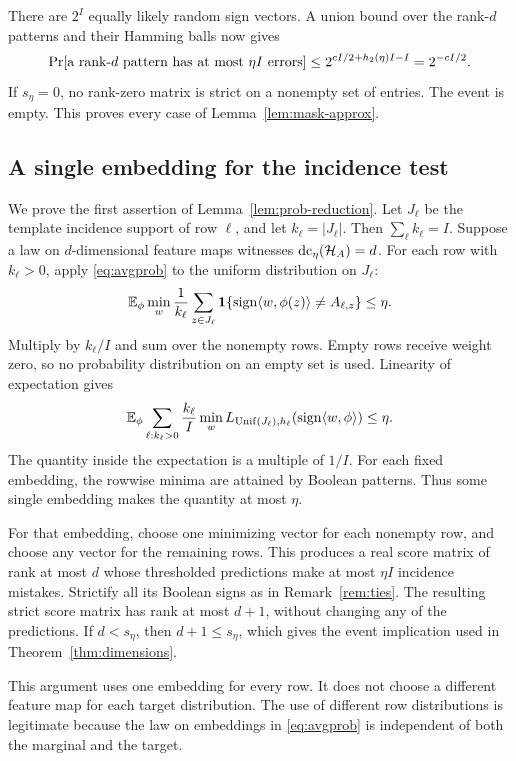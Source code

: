 There are $2^I$ equally likely random sign vectors. A union bound over the rank-$d$ patterns and their Hamming balls now gives
\[
 \Pr[\text{a rank-}d\text{ pattern has at most }\eta I\text{ errors}]
 \le 2^{cI/2+h_2(\eta)I-I}
 =2^{-cI/2}.
\]
If $s_\eta=0$, no rank-zero matrix is strict on a nonempty set of entries. The event is empty. This proves every case of Lemma~\ref{lem:mask-approx}.

\subsection{A single embedding for the incidence test}
We prove the first assertion of Lemma~\ref{lem:prob-reduction}. Let $J_\ell$ be the template incidence support of row $\ell$, and let $k_\ell=|J_\ell|$. Then $\sum_\ell k_\ell=I$. Suppose a law on $d$-dimensional feature maps witnesses $\operatorname{dc}_\eta(\mathcal H_A)=d$. For each row with $k_\ell>0$, apply \eqref{eq:avgprob} to the uniform distribution on $J_\ell$:
\[
 \mathbb E_\phi\min_w\frac1{k_\ell}
 \sum_{z\in J_\ell}\mathbf 1\{\operatorname{sign}\langle w,\phi(z)\rangle\ne A_{\ell,z}\}
 \le\eta.
\]
Multiply by $k_\ell/I$ and sum over the nonempty rows. Empty rows receive weight zero, so no probability distribution on an empty set is used. Linearity of expectation gives
\begin{equation}
 \mathbb E_\phi\sum_{\ell:k_\ell>0}\frac{k_\ell}{I}
 \min_wL_{\operatorname{Unif}(J_\ell),h_\ell}(\operatorname{sign}\langle w,\phi\rangle)
 \le\eta.
\label{eq:weighted-incidence}
\end{equation}
The quantity inside the expectation is a multiple of $1/I$. For each fixed embedding, the rowwise minima are attained by Boolean patterns. Thus some single embedding makes the quantity at most $\eta$.

For that embedding, choose one minimizing vector for each nonempty row, and choose any vector for the remaining rows. This produces a real score matrix of rank at most $d$ whose thresholded predictions make at most $\eta I$ incidence mistakes. Strictify all its Boolean signs as in Remark~\ref{rem:ties}. The resulting strict score matrix has rank at most $d+1$, without changing any of the predictions. If $d<s_\eta$, then $d+1\le s_\eta$, which gives the event implication used in Theorem~\ref{thm:dimensions}.

This argument uses one embedding for every row. It does not choose a different feature map for each target distribution. The use of different row distributions is legitimate because the law on embeddings in \eqref{eq:avgprob} is independent of both the marginal and the target.

